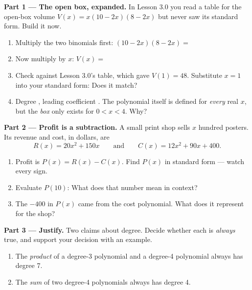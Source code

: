 \documentclass[10pt]{article}
\begin{document}
\begin{tcolorbox}[colback=white, colframe=black!40, title=\textbf{Tier E --- Extension},
    fonttitle=\bfseries, arc=1.5mm, left=3mm, right=3mm, top=2mm, bottom=2mm, breakable]
\textbf{Part 1 --- The open box, expanded.} In Lesson 3.0 you read a table for the open-box volume
$V(x) = x(10-2x)(8-2x)$ but never saw its standard form. Build it now.
\begin{enumerate}[label=(\alph*), leftmargin=1.8em, itemsep=6pt]
  \item Multiply the two binomials first: $(10-2x)(8-2x) = $ \blank{5.0cm}
  \item Now multiply by $x$: \; $V(x) = $ \blank{5.5cm}
  \item Check against Lesson 3.0's table, which gave $V(1) = 48$. Substitute $x=1$ into your standard
        form: \blank{4.5cm} \; Does it match? \blank{1.4cm}
  \item Degree \blank{1.0cm}, leading coefficient \blank{1.0cm}. The polynomial itself is defined for
        \emph{every} real $x$, but the \emph{box} only exists for $0 < x < 4$. Why? \writeline
\end{enumerate}

\vspace{5pt}
\textbf{Part 2 --- Profit is a subtraction.} A small print shop sells $x$ hundred posters. Its revenue
and cost, in dollars, are
\[
  R(x) = 20x^2 + 150x \qquad\text{and}\qquad C(x) = 12x^2 + 90x + 400 .
\]
\begin{enumerate}[label=(\alph*), leftmargin=1.8em, itemsep=6pt]
  \item Profit is $P(x) = R(x) - C(x)$. Find $P(x)$ in standard form --- watch every sign.
        \blank{5.5cm}
  \item Evaluate $P(10)$: \blank{3.0cm} \; What does that number mean in context? \writeline
  \item The $-400$ in $P(x)$ came from the cost polynomial. What does it represent for the shop?
        \writeline
\end{enumerate}

\vspace{5pt}
\textbf{Part 3 --- Justify.} Two claims about degree. Decide whether each is \emph{always} true, and
support your decision with an example.
\begin{enumerate}[label=(\alph*), leftmargin=1.8em, itemsep=6pt]
  \item The \emph{product} of a degree-3 polynomial and a degree-4 polynomial always has degree 7.
  \item The \emph{sum} of two degree-4 polynomials always has degree 4. 
\end{enumerate}
\end{tcolorbox}
\end{document}
